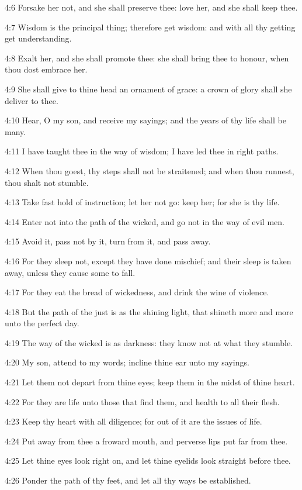 4:6 Forsake her not, and she shall preserve thee: love her, and she shall keep thee.

4:7 Wisdom is the principal thing; therefore get wisdom: and with all thy getting get understanding.

4:8 Exalt her, and she shall promote thee: she shall bring thee to honour, when thou dost embrace her.

4:9 She shall give to thine head an ornament of grace: a crown of glory shall she deliver to thee.

4:10 Hear, O my son, and receive my sayings; and the years of thy life shall be many.

4:11 I have taught thee in the way of wisdom; I have led thee in right paths.

4:12 When thou goest, thy steps shall not be straitened; and when thou runnest, thou shalt not stumble.

4:13 Take fast hold of instruction; let her not go: keep her; for she is thy life.

4:14 Enter not into the path of the wicked, and go not in the way of evil men.

4:15 Avoid it, pass not by it, turn from it, and pass away.

4:16 For they sleep not, except they have done mischief; and their sleep is taken away, unless they cause some to fall.

4:17 For they eat the bread of wickedness, and drink the wine of violence.

4:18 But the path of the just is as the shining light, that shineth more and more unto the perfect day.

4:19 The way of the wicked is as darkness: they know not at what they stumble.

4:20 My son, attend to my words; incline thine ear unto my sayings.

4:21 Let them not depart from thine eyes; keep them in the midst of thine heart.

4:22 For they are life unto those that find them, and health to all their flesh.

4:23 Keep thy heart with all diligence; for out of it are the issues of life.

4:24 Put away from thee a froward mouth, and perverse lips put far from thee.

4:25 Let thine eyes look right on, and let thine eyelids look straight before thee.

4:26 Ponder the path of thy feet, and let all thy ways be established.


